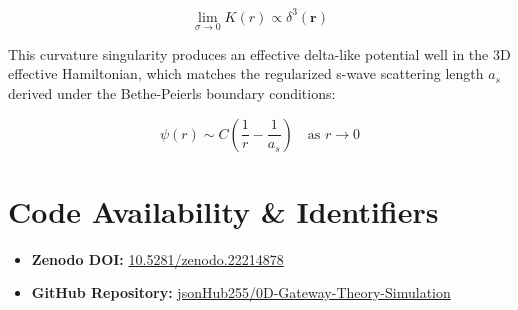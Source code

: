 \documentclass[11pt,a4paper]{article}
\begin{document}
\begin{equation}
\lim_{\sigma \to 0} K(r) \propto \delta^3(\mathbf{r})
\end{equation}

This curvature singularity produces an effective delta-like potential well in the 3D effective Hamiltonian, which matches the regularized s-wave scattering length $a_s$ derived under the Bethe-Peierls boundary conditions:

\begin{equation}
\psi(r) \sim C \left( \frac{1}{r} - \frac{1}{a_s} \right) \quad \text{as } r \to 0
\end{equation}

\section{Code Availability \& Identifiers}
\begin{itemize}
    \item \textbf{Zenodo DOI:} \href{https://doi.org/10.5281/zenodo.22214878}{10.5281/zenodo.22214878}
    \item \textbf{GitHub Repository:} \href{https://github.com/jsonHub255/0D-Gateway-Theory-Simulation}{jsonHub255/0D-Gateway-Theory-Simulation}
\end{itemize}
\end{document}

